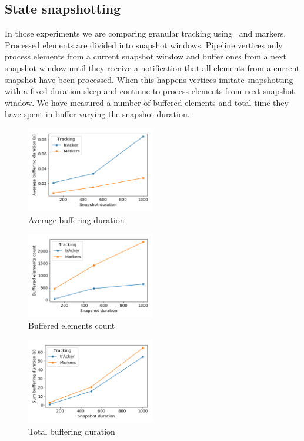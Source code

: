 \subsection{State snapshotting} \label{snapshotting}

In those experiments we are comparing granular tracking using \tracker\ and markers. Processed elements are divided into snapshot windows. Pipeline vertices only process elements from a current snapshot window and buffer ones from a next snapshot window until they receive a notification that all elements from a current snapshot have been processed. When this happens vertices imitate snapshotting with a fixed duration sleep and continue to process elements from next snapshot window. We have measured a number of buffered elements and total time they have spent in buffer varying the snapshot duration.

\begin{figure}[htbp]
  \centering
  \includegraphics[width=0.50\textwidth]{pics/buffering_average_duration.png}
  \caption{Average buffering duration}
\end{figure}
\begin{figure}[htbp]
  \centering
  \includegraphics[width=0.50\textwidth]{pics/buffering_count.png}
  \caption{Buffered elements count}
\end{figure}
\begin{figure}[htbp]
  \centering
  \includegraphics[width=0.50\textwidth]{pics/buffering_sum_duration.png}
  \caption{Total buffering duration}
\end{figure}

